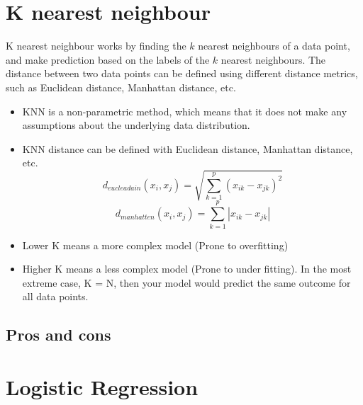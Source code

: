 \documentclass[12pt,a4paper]{article}
\begin{document}
\section{K nearest neighbour}
K nearest neighbour works by finding the $k$ nearest neighbours of a data point, and make prediction based on the labels of the $k$ nearest neighbours. The distance between two data points can be defined using different distance metrics, such as Euclidean distance, Manhattan distance, etc.
\begin{itemize}
    \item KNN is a non-parametric method, which means that it does not make any assumptions about the underlying data distribution.
    \item KNN distance can be defined with Euclidean distance, Manhattan distance, etc.
    $$
    d_{eucleadain}\left(x_{i}, x_{j}\right)=\sqrt{\sum_{k=1}^{p}\left(x_{i k}-x_{j k}\right)^{2}}
    $$
    $$
    d_{manhatten} \left(x_{i}, x_{j}\right)=\sum_{k=1}^{p}\left|x_{i k}-x_{j k}\right|
    $$
    \item Lower K means a more complex model (Prone to overfitting)
    \item Higher K means a less complex model (Prone to under fitting). 
    In the most extreme case, K = N, then your model would predict the same outcome for all data points.
\end{itemize}
\subsection{Pros and cons}
\item

\section{Logistic Regression}
\end{document}

